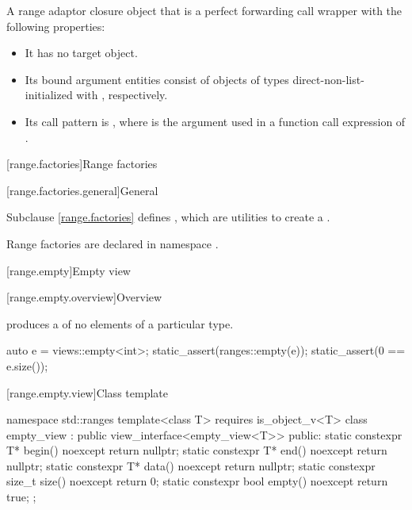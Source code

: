 \begin{itemdescr}
\pnum
\returns
A range adaptor closure object 
that is a perfect forwarding call wrapper
with the following properties:
\begin{itemize}
\item
It has no target object.
\item
Its bound argument entities  consist of
objects of types 
direct-non-list-initialized with ,
respectively.
\item
Its call pattern is ,
where  is the argument used in a function call expression of .
\end{itemize}
\end{itemdescr}

[range.factories]{Range factories}

[range.factories.general]{General}

\pnum
Subclause \ref{range.factories} defines ,
which are utilities to create a .

\pnum
Range factories are declared in namespace .

[range.empty]{Empty view}

[range.empty.overview]{Overview}

\pnum
{} produces a  of no elements of
a particular type.

\pnum
\begin{example}
\begin{codeblock}
auto e = views::empty<int>;
static_assert(ranges::empty(e));
static_assert(0 == e.size());
\end{codeblock}
\end{example}

[range.empty.view]{Class template }

%
\begin{codeblock}
namespace std::ranges {
  template<class T>
    requires is_object_v<T>
  class empty_view : public view_interface<empty_view<T>> {
  public:
    static constexpr T* begin() noexcept { return nullptr; }
    static constexpr T* end() noexcept { return nullptr; }
    static constexpr T* data() noexcept { return nullptr; }
    static constexpr size_t size() noexcept { return 0; }
    static constexpr bool empty() noexcept { return true; }
  };
}
\end{codeblock}


